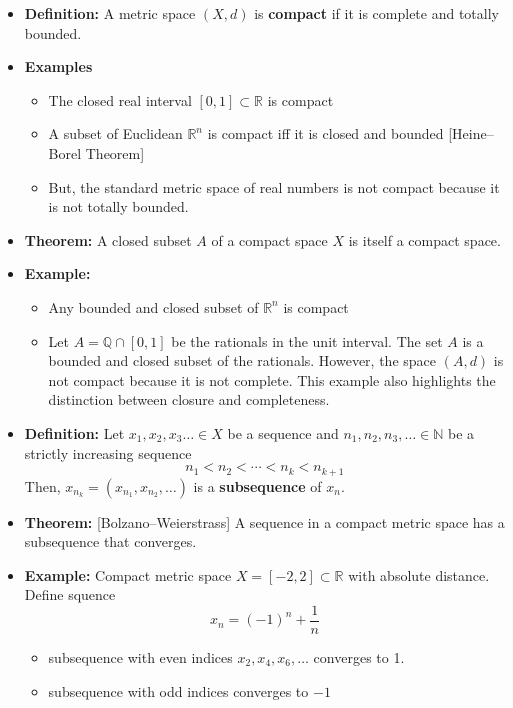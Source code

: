 \documentclass[11pt,twoside]{report}
\newcommand{\bbR}{{\mathbb{R}}}
\newcommand{\bbQ}{{\mathbb{Q}}}
\begin{document}
\begin{itemize}
\item \textbf{Definition:} A metric space $(X,d)$ is \textbf{compact} if it is complete and totally bounded.


\item \textbf{Examples}
\begin{itemize} 
  \item The closed real interval $[0,1]\subset \bbR$ is compact
  \item A subset of Euclidean $\bbR^n$ is compact iff it is closed and bounded [Heine–Borel Theorem]
  \item But, the standard metric space of real numbers is not compact because it is not totally bounded.
\end{itemize}


\item \textbf{Theorem:} A closed subset $A$ of a compact space $X$ is itself a compact space.

\item \textbf{Example:}

\begin{itemize}
\item Any bounded and closed subset of $\bbR^n$ is compact
\item Let $A= \bbQ \cap [0,1]$ be the rationals in the unit interval. The set $A$ is a  bounded and closed subset of the rationals. However, the space $(A, d)$ is not compact because it is not complete. This example also highlights the distinction between closure and completeness. 
\end{itemize}


\item \textbf{Definition:}  Let $x_1,x_2,x_3\ldots \in X$ be a sequence and $n_1,n_2,n_3, \ldots\in \mathbb{N}$ be
a strictly increasing sequence
\[
n_1 < n_2 < \cdots < n_{k} < n_{k+1} 
\]
Then, $x_{n_k} = (x_{n_1},x_{n_2},\ldots)$ is a \textbf{subsequence} of $x_n$.


\item \textbf{Theorem:}  [Bolzano--Weierstrass]
A sequence in a compact metric space has a subsequence that converges.


\item \textbf{Example:} Compact metric space $X=[-2,2]\subset \mathbb{R}$ with absolute distance. Define squence
\[
 x_n = (-1)^n + \frac{1}{n}
 \]
\begin{itemize}
\item subsequence with even indices $x_2,x_4,x_6,\ldots$ converges to 1.
\item subsequence with odd indices converges to $-1$ 
\end{itemize}



\end{itemize}
\end{document}
